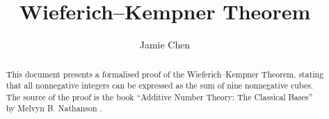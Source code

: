 \documentclass[11pt,a4paper]{article}
\begin{document}
\title{Wieferich--Kempner Theorem}
\author{Jamie Chen}
\maketitle

\begin{abstract}

This document presents a formalised proof of the Wieferich--Kempner Theorem,
stating that all nonnegative integers can be expressed as the sum of nine
nonnegative cubes.  The source of the proof is the book ``Additive Number
Theory: The Classical Bases'' by Melvyn B. Nathanson \cite{nathanson1996}.

\end{abstract}

\newpage
\tableofcontents
\newpage



\newpage
\raggedright


\end{document}
